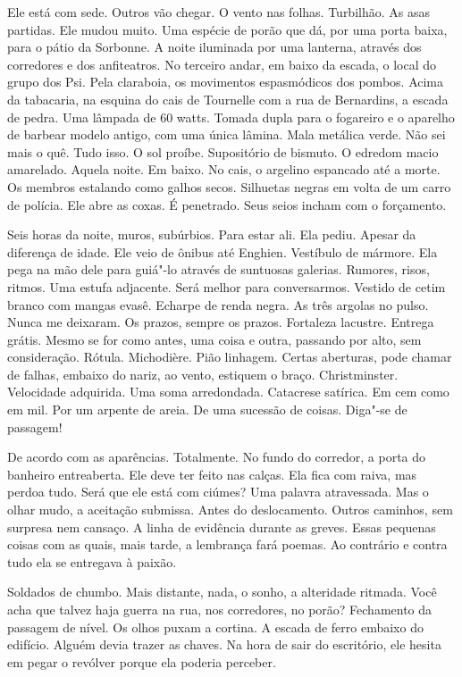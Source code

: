 Ele está com sede. Outros vão chegar. O vento nas folhas. Turbilhão. As
asas partidas. Ele mudou muito. Uma espécie de porão que dá, por uma
porta baixa, para o pátio da Sorbonne. A noite iluminada por uma
lanterna, através dos corredores e dos anfiteatros. No terceiro andar,
em baixo da escada, o local do grupo dos Psi. Pela claraboia, os
movimentos espasmódicos dos pombos. Acima da tabacaria, na esquina do
cais de Tournelle com a rua de Bernardins, a escada de pedra. Uma
lâmpada de 60 watts. Tomada dupla para o fogareiro e o aparelho de
barbear modelo antigo, com uma única lâmina. Mala metálica verde. Não
sei mais o quê. Tudo isso. O sol proíbe. Supositório de bismuto. O
edredom macio amarelado. Aquela noite. Em baixo. No cais, o argelino
espancado até a morte. Os membros estalando como galhos secos. Silhuetas
negras em volta de um carro de polícia. Ele abre as coxas. É penetrado.
Seus seios incham com o forçamento.

Seis horas da noite, muros, subúrbios. Para estar ali. Ela pediu. Apesar
da diferença de idade. Ele veio de ônibus até Enghien. Vestíbulo de
mármore. Ela pega na mão dele para guiá"-lo através de suntuosas
galerias. Rumores, risos, ritmos. Uma estufa adjacente. Será melhor para
conversarmos. Vestido de cetim branco com mangas evasê. Echarpe de renda
negra. As três argolas no pulso. Nunca me deixaram. Os prazos, sempre os
prazos. Fortaleza lacustre. Entrega grátis. Mesmo se for como antes, uma
coisa e outra, passando por alto, sem consideração. Rótula. Michodière.
Pião linhagem. Certas aberturas, pode chamar de falhas, embaixo do
nariz, ao vento, estiquem o braço. Christminster. Velocidade adquirida.
Uma soma arredondada. Catacrese satírica. Em cem como em mil. Por um
arpente de areia. De uma sucessão de coisas. Diga"-se de passagem!

De acordo com as aparências. Totalmente. No fundo do corredor, a porta
do banheiro entreaberta. Ele deve ter feito nas calças. Ela fica com
raiva, mas perdoa tudo. Será que ele está com ciúmes? Uma palavra
atravessada. Mas o olhar mudo, a aceitação submissa. Antes do
deslocamento. Outros caminhos, sem surpresa nem cansaço. A linha de
evidência durante as greves. Essas pequenas coisas com as quais, mais
tarde, a lembrança fará poemas. Ao contrário e contra tudo ela se
entregava à paixão.

Soldados de chumbo. Mais distante, nada, o sonho, a alteridade ritmada.
Você acha que talvez haja guerra na rua, nos corredores, no porão?
Fechamento da passagem de nível. Os olhos puxam a cortina. A escada de
ferro embaixo do edifício. Alguém devia trazer as chaves. Na hora de
sair do escritório, ele hesita em pegar o revólver porque ela poderia
perceber.

